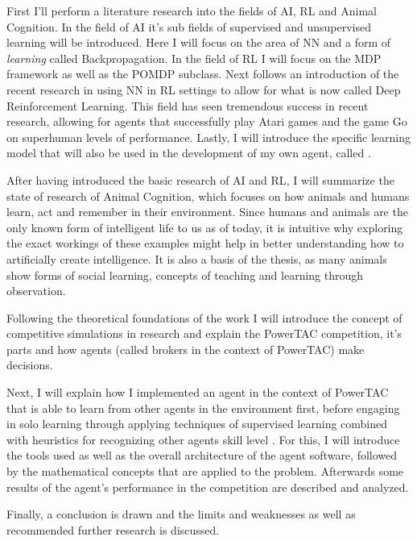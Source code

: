 First I'll perform a literature research into the fields of \ac{AI}, \ac{RL} and Animal Cognition. In the field of AI it's sub fields of supervised and unsupervised learning will be introduced. Here I will focus on the area of \ac{NN} and a form of \emph{learning}  called Backpropagation. In the field of \ac{RL} I will focus on the \ac{MDP} framework as well as the \ac{POMDP} subclass. 
Next follows an introduction of the recent research in using \ac{NN} in \ac{RL} settings to allow for what is now called Deep Reinforcement Learning. This field has seen tremendous success in recent research, allowing for agents that successfully play 
Atari games and the game Go on superhuman levels of performance.
Lastly, I will introduce the specific learning model that will also be used in the development of my own agent, called %
.

After having introduced the basic research of \ac{AI} and \ac{RL}, I will summarize the state of research of Animal Cognition, which focuses on how animals and humans learn, act and remember in their environment. Since humans and animals are the only known form of intelligent life to us as of today, it is intuitive why exploring the exact workings of these examples might help in better understanding how to artificially create intelligence. It is also a basis of the thesis, as many animals show forms of social learning, concepts of teaching and learning through observation.

Following the theoretical foundations of the work I will introduce the concept of competitive simulations in research and explain the \ac{PowerTAC} competition, it's parts and how agents (called brokers in the context of \ac{PowerTAC}) make decisions. 

Next, I will explain how I implemented an agent in the context of \ac{PowerTAC} that is able to learn from other agents in the environment first, before engaging in solo learning through applying techniques of supervised learning combined with heuristics for recognizing other agents skill level %
. For this, I will introduce the tools used as well as the overall architecture of the agent software, followed by the mathematical concepts that are applied to the problem. Afterwards some results of the agent's performance in the competition are described and analyzed.

Finally, a conclusion is drawn and the limits and weaknesses as well as recommended further research is discussed.


